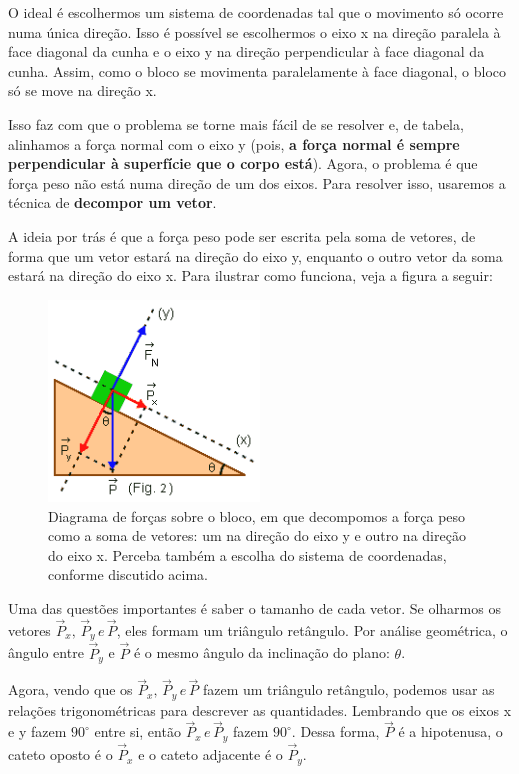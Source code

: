 \documentclass[12pt]{extarticle}
\newcommand{\<}{\langle}
\renewcommand{\>}{\rangle}
\theoremstyle{definition}
\begin{document}
O ideal é escolhermos um sistema de coordenadas tal que o movimento só ocorre numa única direção. Isso é possível se escolhermos o eixo x na direção paralela à face diagonal da cunha e o eixo y na direção perpendicular à face diagonal da cunha. Assim, como o bloco se movimenta paralelamente à face diagonal, o bloco só se move na direção x.

Isso faz com que o problema se torne mais fácil de se resolver e, de tabela, alinhamos a força normal com o eixo y (pois, \textbf{a força normal é sempre perpendicular à superfície que o corpo está}). Agora, o problema é que força peso não está numa direção de um dos eixos. Para resolver isso, usaremos a técnica de \textbf{decompor um vetor}.

A ideia por trás é que a força peso pode ser escrita pela soma de vetores, de forma que um vetor estará na direção do eixo y, enquanto o outro vetor da soma estará na direção do eixo x. Para ilustrar como funciona, veja a figura a seguir:

\begin{figure}[H]
    \centering
    \includegraphics[width=0.5\textwidth]{_2025_38.png}
    \caption{Diagrama de forças sobre o bloco, em que decompomos a força peso como a soma de vetores: um na direção do eixo y e outro na direção do eixo x. Perceba também a escolha do sistema de coordenadas, conforme discutido acima.}
    \label{fig:decompose}
\end{figure}

Uma das questões importantes é saber o tamanho de cada vetor. Se olharmos os vetores $\vec{P}_x,\, \vec{P}_y\,e\, \vec{P}$, eles formam um triângulo retângulo. Por análise geométrica, o ângulo entre $\vec{P}_y$ e $\vec{P}$ é o mesmo ângulo da inclinação do plano: $\theta$.

Agora, vendo que os $\vec{P}_x,\, \vec{P}_y\,e\, \vec{P}$ fazem um triângulo retângulo, podemos usar as relações trigonométricas para descrever as quantidades. Lembrando que os eixos x e y fazem $90^\circ$ entre si, então $\vec{P}_x\, e \, \vec{P}_y$ fazem $90^\circ$. Dessa forma, $\vec{P}$ é a hipotenusa, o cateto oposto é o $\vec{P}_x$ e o cateto adjacente é o $\vec{P}_y$.
\end{document}
